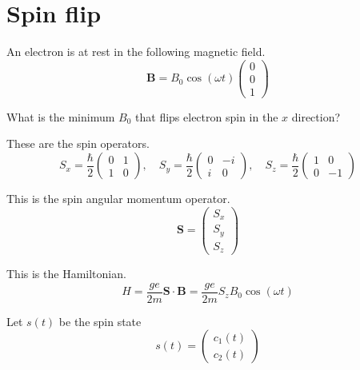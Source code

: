 


\section*{Spin flip}

An electron is at rest in the following magnetic field.
\begin{equation*}
\mathbf B=B_0\cos(\omega t)\begin{pmatrix}0\\0\\1\end{pmatrix}
\end{equation*}

What is the minimum $B_0$ that flips electron spin in the $x$ direction?

\bigskip
These are the spin operators.
\begin{equation*}
S_x=\frac{\hbar}{2}\begin{pmatrix}0&1\\1&0\end{pmatrix},\quad
S_y=\frac{\hbar}{2}\begin{pmatrix}0&-i\\i&0\end{pmatrix},\quad
S_z=\frac{\hbar}{2}\begin{pmatrix}1&0\\0&-1\end{pmatrix}
\end{equation*}

This is the spin angular momentum operator.
\begin{equation*}
\mathbf S=\begin{pmatrix}S_x\\S_y\\S_z\end{pmatrix}
\end{equation*}

This is the Hamiltonian.
\begin{equation*}
H=\frac{ge}{2m}\mathbf S\cdot\mathbf B
=\frac{ge}{2m}S_zB_0\cos(\omega t)
\end{equation*}

Let $s(t)$ be the spin state
\begin{equation*}
s(t)=\begin{pmatrix}c_1(t)\\c_2(t)\end{pmatrix}
\end{equation*}

